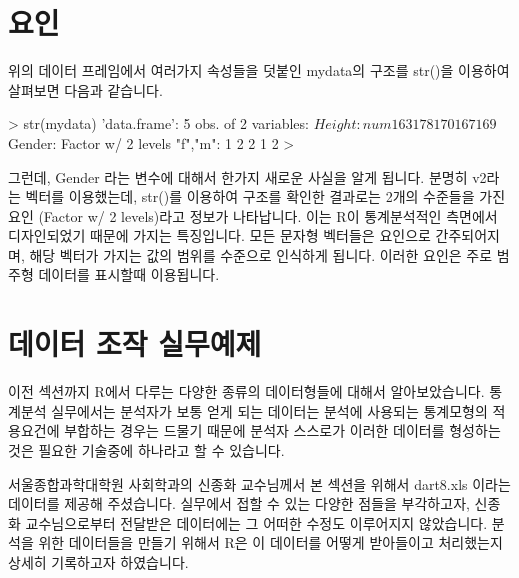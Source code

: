 \section{요인}

위의 데이터 프레임에서 여러가지 속성들을 덧붙인 mydata의 구조를 str()을 이용하여 살펴보면 다음과 같습니다.

\begin{Schunk}
\begin{Soutput}
> str(mydata)
'data.frame':	5 obs. of  2 variables:
 $ Height: num  163 178 170 167 169
 $ Gender: Factor w/ 2 levels "f","m": 1 2 2 1 2
> 
\end{Soutput}
\end{Schunk}

그런데, Gender 라는 변수에 대해서 한가지 새로운 사실을 알게 됩니다. 
분명히 v2라는 벡터를 이용했는데, str()를 이용하여 구조를 확인한 결과로는 2개의 수준들을 가진 요인 (Factor w/ 2 levels)라고 정보가 나타납니다.
이는 R이 통계분석적인 측면에서 디자인되었기 때문에 가지는 특징입니다.
모든 문자형 벡터들은 요인으로 간주되어지며, 해당 벡터가 가지는 값의 범위를 수준으로 인식하게 됩니다.
이러한 요인은 주로 범주형 데이터를 표시할때 이용됩니다.



%
%

\section{데이터 조작 실무예제}

이전 섹션까지 R에서 다루는 다양한 종류의 데이터형들에 대해서 알아보았습니다.
통계분석 실무에서는 분석자가 보통 얻게 되는 데이터는 분석에 사용되는 통계모형의 적용요건에 부합하는 경우는 드물기 때문에 분석자 스스로가 이러한 데이터를 형성하는 것은 필요한 기술중에 하나라고 할 수 있습니다.

서울종합과학대학원 사회학과의 신종화 교수님께서 본 섹션을 위해서 dart8.xls 이라는 데이터를 제공해 주셨습니다. 
실무에서 접할 수 있는 다양한 점들을 부각하고자, 신종화 교수님으로부터 전달받은 데이터에는 그 어떠한 수정도 이루어지지 않았습니다.
분석을 위한 데이터들을 만들기 위해서 R은 이 데이터를 어떻게 받아들이고 처리했는지 상세히 기록하고자 하였습니다.

